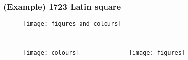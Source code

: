 \begin{frame}
\frametitle{(Example) 1723 Latin square}
\pause[1]
\begin{figure}
	\texttt{[image: figures\_and\_colours]}
\end{figure}

\begin{columns}
	\pause[2]
	\begin{figure}
		\texttt{[image: colours]}
	\end{figure}
	\pause[3]
	\begin{figure}
		\texttt{[image: figures]}
	\end{figure}
	
\end{columns}
\end{frame}


